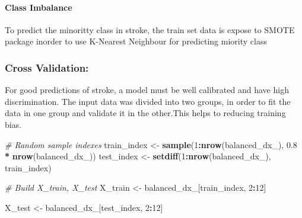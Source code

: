 \documentclass[]{article}
\newenvironment{Shaded}{\begin{snugshade}}{\end{snugshade}}
\newcommand{\CommentTok}[1]{\textcolor[rgb]{0.56,0.35,0.01}{\textit{#1}}}
\newcommand{\DataTypeTok}[1]{\textcolor[rgb]{0.13,0.29,0.53}{#1}}
\newcommand{\DecValTok}[1]{\textcolor[rgb]{0.00,0.00,0.81}{#1}}
\newcommand{\FloatTok}[1]{\textcolor[rgb]{0.00,0.00,0.81}{#1}}
\newcommand{\KeywordTok}[1]{\textcolor[rgb]{0.13,0.29,0.53}{\textbf{#1}}}
\newcommand{\NormalTok}[1]{#1}
\newcommand{\OperatorTok}[1]{\textcolor[rgb]{0.81,0.36,0.00}{\textbf{#1}}}
\newcommand{\StringTok}[1]{\textcolor[rgb]{0.31,0.60,0.02}{#1}}
\let\oldparagraph\paragraph
\renewcommand{\paragraph}[1]{\oldparagraph{#1}\mbox{}}
\begin{document}
\hypertarget{class-imbalance}{%
\paragraph{Class Imbalance}\label{class-imbalance}}

To predict the minoritty class in stroke, the train set data is expose
to SMOTE package inorder to use K-Nearest Neighbour for predicting
miority class

\begin{Shaded}
\end{Shaded}

\hypertarget{cross-validation}{%
\subsubsection{Cross Validation:}\label{cross-validation}}

For good predictions of stroke, a model must be well calibrated and have
high discrimination. The input data was divided into two groups, in
order to fit the data in one group and validate it in the other.This
helps to reducing training bias.

\begin{Shaded}
\begin{Highlighting}[]
\CommentTok{# Random sample indexes}
\NormalTok{train_index <-}\StringTok{ }\KeywordTok{sample}\NormalTok{(}\DecValTok{1}\OperatorTok{:}\KeywordTok{nrow}\NormalTok{(balanced_dx_), }\FloatTok{0.8} \OperatorTok{*}\StringTok{ }\KeywordTok{nrow}\NormalTok{(balanced_dx_))}
\NormalTok{test_index <-}\StringTok{ }\KeywordTok{setdiff}\NormalTok{(}\DecValTok{1}\OperatorTok{:}\KeywordTok{nrow}\NormalTok{(balanced_dx_), train_index)}

\CommentTok{# Build X_train, X_test}
\NormalTok{X_train <-}\StringTok{ }\NormalTok{balanced_dx_[train_index, }\DecValTok{2}\OperatorTok{:}\DecValTok{12}\NormalTok{]}

\NormalTok{X_test <-}\StringTok{ }\NormalTok{balanced_dx_[test_index, }\DecValTok{2}\OperatorTok{:}\DecValTok{12}\NormalTok{]}
\end{Highlighting}
\end{Shaded}
\end{document}
